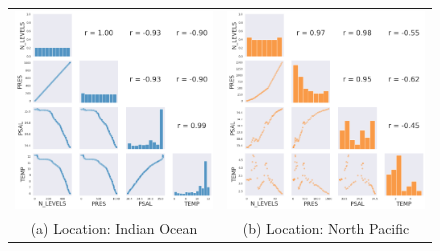 \documentclass[12pt]{article}
\begin{document}
    
\begin{figure}[!htb]
\begin{tabular}{cc}
    \hspace{-30pt} \includegraphics[width=70mm]{correlation1.png} &\hspace{10pt}   \includegraphics[width=70mm]{correlation2.png} \\
    (a) Location: Indian Ocean & (b) Location: North Pacific \\[15pt]

\end{tabular}
\end{figure}
\end{document}
